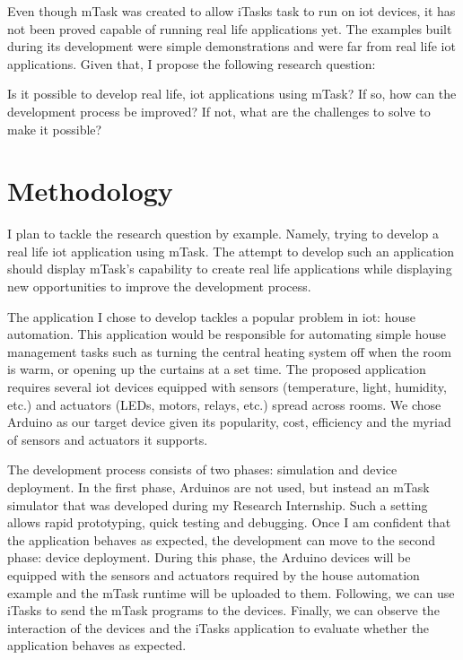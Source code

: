\documentclass{article}
\begin{document}
Even though mTask was created to allow iTasks task to run on \acrshort{iot} devices, it has not been proved capable of running real life applications yet. The examples built during its development were simple demonstrations and were far from real life \acrshort{iot} applications. Given that, I propose the following research question:

Is it possible to develop real life, \acrshort{iot} applications using mTask? If so, how can the development process be improved? If not, what are the challenges to solve to make it possible?

\section{Methodology}

I plan to tackle the research question by example. Namely, trying to develop a real life \acrshort{iot} application using mTask. The attempt to develop such an application should display mTask's capability to create real life applications while displaying new opportunities to improve the development process.

The application I chose to develop tackles a popular problem in \acrshort{iot}: house automation. This application would be responsible for automating simple house management tasks such as turning the central heating system off when the room is warm, or opening up the curtains at a set time. The proposed application requires several \acrshort{iot} devices equipped with sensors (temperature, light, humidity, etc.) and actuators (LEDs, motors, relays, etc.) spread across rooms. We chose Arduino as our target device given its popularity, cost, efficiency and the myriad of sensors and actuators it supports.

The development process consists of two phases: simulation and device deployment. In the first phase, Arduinos are not used, but instead an mTask simulator that was developed during my Research Internship. Such a setting allows rapid prototyping, quick testing and debugging. Once I am confident that the application behaves as expected, the development can move to the second phase: device deployment. During this phase, the Arduino devices will be equipped with the sensors and actuators required by the house automation example and the mTask runtime will be uploaded to them. Following, we can use iTasks to send the mTask programs to the devices. Finally, we can observe the interaction of the devices and the iTasks application to evaluate whether the application behaves as expected. 
\end{document}
